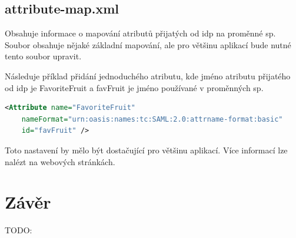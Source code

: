 \section{attribute-map.xml}
Obsahuje informace o mapování atributů přijatých od idp na proměnné sp. Soubor obsahuje nějaké základní mapování, ale pro většinu aplikací bude nutné tento soubor upravit.

Následuje příklad přidání jednoduchého atributu, kde jméno atributu přijatého od idp je FavoriteFruit a favFruit je jméno používané v proměnných sp\cite{AddAttribute}.
 \begin{lstlisting}[language=XML]
     <Attribute name="FavoriteFruit"
    nameFormat="urn:oasis:names:tc:SAML:2.0:attrname-format:basic"
    id="favFruit" />
    \end{lstlisting}
    
Toto nastavení by mělo být dostačující pro většinu aplikací. Více informací lze nalézt na webových stránkách\cite{AddAttribute}.

\chapter{Závěr}
TODO:
\label{zaver}






